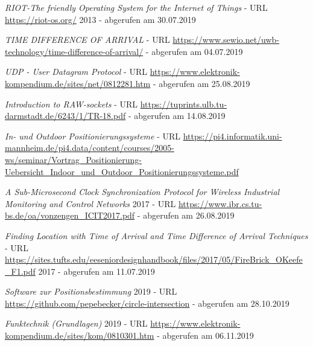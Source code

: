 \begin{thebibliography}{}
	\textit{RIOT-The friendly Operating System for the Internet of Things} - URL \url{https://riot-os.org/} 2013 - abgerufen am 30.07.2019	


	\textit{TIME DIFFERENCE OF ARRIVAL} - URL \url{https://www.sewio.net/uwb-technology/time-difference-of-arrival/} - abgerufen am 04.07.2019	


	\textit{UDP - User Datagram Protocol} - URL \url{https://www.elektronik-kompendium.de/sites/net/0812281.htm} - abgerufen am 25.08.2019	

	\textit{Introduction to RAW-sockets} - URL \url{https://tuprints.ulb.tu-darmstadt.de/6243/1/TR-18.pdf} - abgerufen am 14.08.2019	

	\textit{In- und Outdoor
Positionierungssysteme} - URL \url{https://pi4.informatik.uni-mannheim.de/pi4.data/content/courses/2005-ws/seminar/Vortrag_Positionierung-Uebersicht_Indoor_und_Outdoor_Positionierungssysteme.pdf} 

	\textit{A Sub-Microsecond Clock Synchronization Protocol for Wireless Industrial Monitoring and Control Networks} 2017 - URL \url{https://www.ibr.cs.tu-bs.de/oa/vonzengen_ICIT2017.pdf} - abgerufen am 26.08.2019

 
	\textit{Finding Location with Time of Arrival and Time Difference of Arrival Techniques} - URL \url{https://sites.tufts.edu/eeseniordesignhandbook/files/2017/05/FireBrick_OKeefe_F1.pdf} 2017 - abgerufen am 11.07.2019	
	


	\textit{Software zur Positionsbestimmung} 2019 - URL \url{https://github.com/pepebecker/circle-intersection} - abgerufen am 28.10.2019	
	
	
	\textit{Funktechnik (Grundlagen)} 2019 - URL \url{https://www.elektronik-kompendium.de/sites/kom/0810301.htm} - abgerufen am 06.11.2019	
	
	
	
	
	
	
	
	
	
	
\end{thebibliography}
